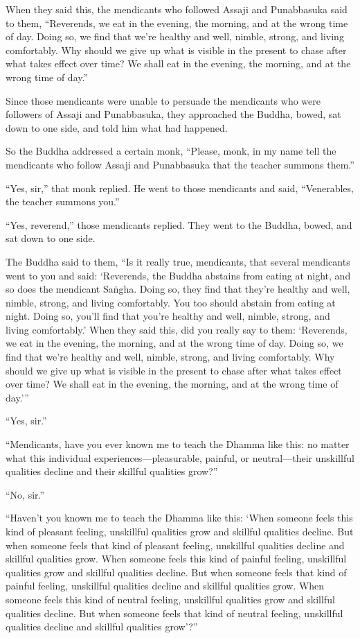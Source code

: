 \documentclass[12pt,openany]{book}%
\begin{document}
When they said this, the mendicants who followed Assaji and Punabbasuka said to them, “Reverends, we eat in the evening, the morning, and at the wrong time of day. Doing so, we find that we’re healthy and well, nimble, strong, and living comfortably. Why should we give up what is visible in the present to chase after what takes effect over time? We shall eat in the evening, the morning, and at the wrong time of day.” 

Since those mendicants were unable to persuade the mendicants who were followers of Assaji and Punabbasuka, they approached the Buddha, bowed, sat down to one side, and told him what had happened. 

So the Buddha addressed a certain monk, “Please, monk, in my name tell the mendicants who follow Assaji and Punabbasuka that the teacher summons them.” 

“Yes, sir,” that monk replied. He went to those mendicants and said, “Venerables, the teacher summons you.” 

“Yes, reverend,” those mendicants replied. They went to the Buddha, bowed, and sat down to one side. 

The Buddha said to them, “Is it really true, mendicants, that several mendicants went to you and said: ‘Reverends, the Buddha abstains from eating at night, and so does the mendicant \textsanskrit{Saṅgha}. Doing so, they find that they’re healthy and well, nimble, strong, and living comfortably. You too should abstain from eating at night. Doing so, you’ll find that you’re healthy and well, nimble, strong, and living comfortably.’ When they said this, did you really say to them: ‘Reverends, we eat in the evening, the morning, and at the wrong time of day. Doing so, we find that we’re healthy and well, nimble, strong, and living comfortably. Why should we give up what is visible in the present to chase after what takes effect over time? We shall eat in the evening, the morning, and at the wrong time of day.’” 

“Yes, sir.” 

“Mendicants, have you ever known me to teach the Dhamma like this: no matter what this individual experiences—pleasurable, painful, or neutral—their unskillful qualities decline and their skillful qualities grow?” 

“No, sir.” 

“Haven’t you known me to teach the Dhamma like this: ‘When someone feels this kind of pleasant feeling, unskillful qualities grow and skillful qualities decline. But when someone feels that kind of pleasant feeling, unskillful qualities decline and skillful qualities grow. When someone feels this kind of painful feeling, unskillful qualities grow and skillful qualities decline. But when someone feels that kind of painful feeling, unskillful qualities decline and skillful qualities grow. When someone feels this kind of neutral feeling, unskillful qualities grow and skillful qualities decline. But when someone feels that kind of neutral feeling, unskillful qualities decline and skillful qualities grow’?” 
\end{document}
